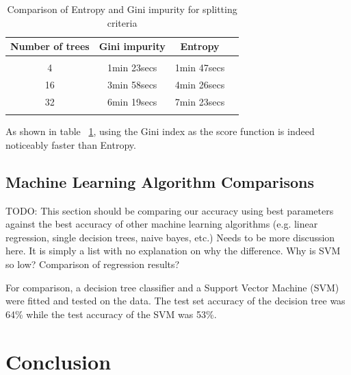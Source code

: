 \documentclass{article} %
\begin{document}
\begin{table}[h]
\caption{Comparison of Entropy and Gini impurity for splitting criteria}
\begin{center}
\begin{tabular}{cccc}
{\bf Number of trees} &{\bf Gini impurity} &{\bf Entropy}
\\ \hline \\
4	&1min 23secs    &1min 47secs\\
16	&3min 58secs    &4min 26secs\\
32	&6min 19secs    &7min 23secs\\
\label{ent-gini}
\end{tabular}
\end{center}
\end{table}

As shown in table ~\ref{ent-gini}, using the Gini index as the score function is indeed noticeably faster than Entropy.


\subsection{Machine Learning Algorithm Comparisons}
TODO:  This section should be comparing our accuracy using best parameters against the best accuracy of other machine learning algorithms (e.g. linear regression, single decision trees, naive bayes, etc.)
Needs to be more discussion here. It is simply a list with no explanation on why the difference. Why is SVM so low? Comparison of regression results?

For comparison, a decision tree classifier and a Support Vector Machine (SVM) were fitted and tested on the data. The test set accuracy of the decision tree was 64\% while the test accuracy of the SVM was 53\%.

\section{Conclusion}
\end{document}
